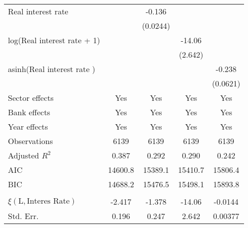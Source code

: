 {\begin{tabular}{l*{4}{c}}
Real interest rate&                  &   -0.136\sym{***}&                  &                  \\
                &                  & (0.0244)         &                  &                  \\
log(Real interest rate + 1)&                  &                  &   -14.06\sym{***}&                  \\
                &                  &                  &  (2.642)         &                  \\
asinh(Real interest rate )&                  &                  &                  &   -0.238\sym{***}\\
                &                  &                  &                  & (0.0621)         \\
Sector effects  &      Yes         &      Yes         &      Yes         &      Yes         \\
Bank effects    &      Yes         &      Yes         &      Yes         &      Yes         \\
Year effects    &      Yes         &      Yes         &      Yes         &      Yes         \\
\hline
Observations    &     6139         &     6139         &     6139         &     6139         \\
Adjusted \(R^{2}\)&    0.387         &    0.292         &    0.290         &    0.242         \\
AIC             &  14600.8         &  15389.1         &  15410.7         &  15806.4         \\
BIC             &  14688.2         &  15476.5         &  15498.1         &  15893.8         \\
\hline          &                  &                  &                  &                  \\
$\xi(\text{L},\text{Interes Rate})$&   -2.417         &   -1.378         &   -14.06         &  -0.0144         \\
\hspace{5mm} Std. Err.&    0.196         &    0.247         &    2.642         &  0.00377         \\
\hline\hline
\end{tabular}
}
